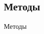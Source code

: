 \documentclass[../diploma.tex]{subfiles}
\begin{document}
\subsection{Методы}

	Методы
\end{document}
